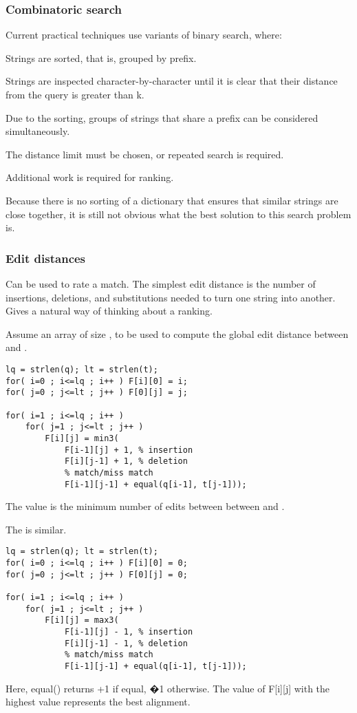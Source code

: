 \subsubsection{Combinatoric search}
Current practical techniques use variants of binary search, where:
\begin{compactitem}
\item Strings are sorted, that is, grouped by prefix.
\item Strings are inspected character-by-character until it is clear that
their distance from the query is greater than k.
\item Due to the sorting, groups of strings that share a prefix can be
considered simultaneously.
\item The distance limit  must be chosen, or repeated search is required.
\item Additional work is required for ranking.
\item Because there is no sorting of a dictionary that ensures that similar
strings are close together, it is still not obvious what the best solution to
this search problem is.
\end{compactitem}

\subsubsection{Edit distances}
Can be used to rate a match. The simplest edit distance is the number of insertions, deletions, and
substitutions needed to turn one string into another. Gives a natural way of thinking about a ranking.

Assume an array  of size , to be used to compute the global edit
distance between  and .
\begin{lstlisting}
lq = strlen(q); lt = strlen(t);
for( i=0 ; i<=lq ; i++ ) F[i][0] = i;
for( j=0 ; j<=lt ; j++ ) F[0][j] = j;

for( i=1 ; i<=lq ; i++ )
    for( j=1 ; j<=lt ; j++ )
        F[i][j] = min3(
            F[i-1][j] + 1, % insertion
            F[i][j-1] + 1, % deletion
            % match/miss match
            F[i-1][j-1] + equal(q[i-1], t[j-1]));
\end{lstlisting}
The value  is the minimum number of edits between between
 and . 

The  is similar.
\begin{lstlisting}
lq = strlen(q); lt = strlen(t);
for( i=0 ; i<=lq ; i++ ) F[i][0] = 0;
for( j=0 ; j<=lt ; j++ ) F[0][j] = 0;

for( i=1 ; i<=lq ; i++ )
    for( j=1 ; j<=lt ; j++ )
        F[i][j] = max3(
            F[i-1][j] - 1, % insertion
            F[i][j-1] - 1, % deletion
            % match/miss match
            F[i-1][j-1] + equal(q[i-1], t[j-1]));
\end{lstlisting}
Here, equal() returns +1 if equal, �1 otherwise. 
The value of F[i][j] with the highest value represents the best
alignment.

